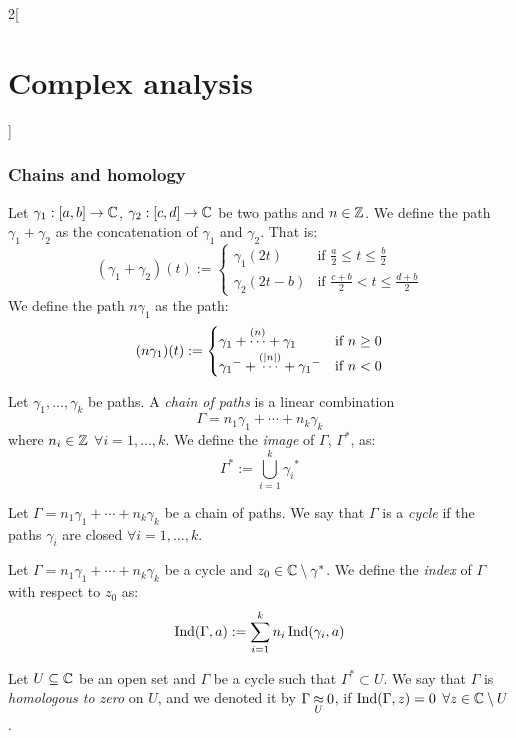 \documentclass[../../../main.tex]{subfiles}
\begin{document}
\begin{multicols}{2}[\section{Complex analysis}]
  \subsubsection{Chains and homology}
  \begin{definition}
    Let $\gamma_1:[a,b]\rightarrow\mathbb{C}$, $\gamma_2:[c,d]\rightarrow\mathbb{C}$ be two paths and $n\in\mathbb{Z}$. We define the path $\gamma_1+\gamma_2$ as the concatenation of $\gamma_1$ and $\gamma_2$. That is:
    $$
      (\gamma_1+\gamma_2)(t):=
      \begin{cases}
        \gamma_1(2t)   & \text{if }\frac{a}{2}\leq t\leq \frac{b}{2}  \\
        \gamma_2(2t-b) & \text{if }\frac{c+b}{2} <t\leq \frac{d+b}{2}
      \end{cases}
    $$
    We define the path $n\gamma_1$ as the path:
    $$
      (n\gamma_1)(t):=
      \begin{cases}
        \gamma_1+\overset{(n)}{\cdots}+\gamma_1               & \text{if }n\geq 0 \\
        {\gamma_1}^-+\overset{(\abs{n})}{\cdots}+{\gamma_1}^- & \text{if }n<0
      \end{cases}
    $$
  \end{definition}
  \begin{definition}
    Let $\gamma_1,\ldots,\gamma_k$ be paths. A \emph{chain of paths} is a linear combination $$\Gamma=n_1\gamma_1+\cdots+n_k\gamma_k$$ where $n_i\in\mathbb{Z}$ $\forall i=1,\ldots,k$. We define the \emph{image} of $\Gamma$, $\Gamma^*$, as:
    $$\Gamma^*:=\bigcup_{i=1}^k{\gamma_i}^*$$
  \end{definition}
  \begin{definition}
    Let $\Gamma=n_1\gamma_1+\cdots+n_k\gamma_k$ be a chain of paths. We say that $\Gamma$ is a \emph{cycle} if the paths $\gamma_i$ are closed $\forall i=1,\ldots,k$.
  \end{definition}
  \begin{definition}
    Let $\Gamma=n_1\gamma_1+\cdots+n_k\gamma_k$ be a cycle and $z_0\in\mathbb{C}\setminus\gamma^*$. We define the \emph{index} of $\Gamma$ with respect to $z_0$ as: $$\operatorname{Ind}(\Gamma,a):=\sum_{i=1}^kn_i\operatorname{Ind}(\gamma_i,a)$$
  \end{definition}
  \begin{definition}
    Let $U\subseteq \mathbb{C}$ be an open set and $\Gamma$ be a cycle such that $\Gamma^*\subset U$. We say that $\Gamma$ is \emph{homologous to zero} on $U$, and we denoted it by $\Gamma\mathbin{\underset{U}{\approx}} 0$, if $\operatorname{Ind}(\Gamma,z)=0$ $\forall z\in\mathbb{C}\setminus U$.
  \end{definition}

\end{multicols}
\end{document}
